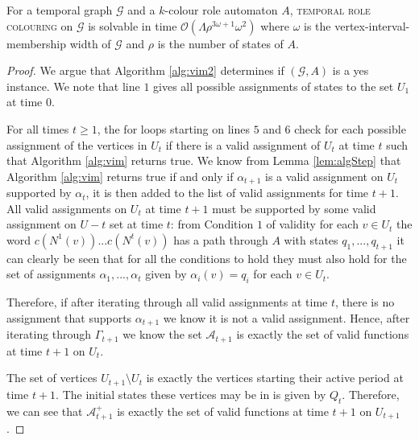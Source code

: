 \documentclass[runningheads]{llncs}
\begin{document}
\begin{theoremrep} \label{thm:vim}
    For a temporal graph $\mathcal{G}$ and a $k$-colour role automaton $A$, \textsc{temporal role colouring} on $\mathcal{G}$ is solvable in time $\mathcal{O}(\Lambda\rho^{3\omega+1}\omega^2)$ where $\omega$ is the vertex-interval-membership width of $\mathcal{G}$ and $\rho$ is the number of states of $A$.
\end{theoremrep}
\begin{proof}

We argue that Algorithm \ref{alg:vim2} determines if $(\mathcal{G},A)$ is a yes instance.
We note that line $1$ gives all possible assignments of states to the set $U_1$ at time $0$. 

For all times $t \geq 1$, the for loops starting on lines $5$ and $6$ check for each possible assignment of the vertices in $U_t$ if there is a valid assignment of $U_t$ at time $t$ such that Algorithm \ref{alg:vim} returns true.
We know from Lemma \ref{lem:algStep} that Algorithm \ref{alg:vim} returns true if and only if $\alpha_{t+1}$ is a valid assignment on $U_t$ supported by $\alpha_t$, it is then added to the list of valid assignments for time $t+1$. 
All valid assignments on $U_t$ at time $t+1$ must be supported by some valid assignment on $U-t$ set at time $t$: 
from Condition $1$ of validity for each $v\in U_t$ the word $c(N^1(v))...c(N^{t}(v))$ has a path through $A$ with states $q_1,...,q_{t+1}$
it can clearly be seen that for all the conditions to hold they must also hold for the set of assignments $\alpha_1,...,\alpha_t$ given by $\alpha_i(v)=q_i$ for each $v \in U_t$.

Therefore, if after iterating through all valid assignments at time $t$, there is no assignment that supports $\alpha_{t+1}$ we know it is not a valid assignment.
Hence, after iterating through $\Gamma_{t+1}$ we know the set $\mathcal{A}_{t+1}$ is exactly the set of valid functions at time $t+1$ on $U_{t}$. 

The set of vertices $U_{t+1}\setminus U_{t}$ is exactly the vertices starting their active period at time $t+1$. The initial states these vertices may be in is given by $Q_t$. Therefore, we can see that $\mathcal{A}^+_{t+1}$ is exactly the set of valid functions at time $t+1$ on $U_{t+1}$.


\end{proof}
\end{document}
